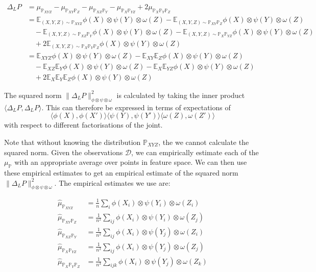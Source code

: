 \documentclass[12pt]{article}
\numberwithin{claim}{section}
\numberwithin{lemma}{section}
\numberwithin{theorem}{section}
\begin{document}
\begin{align*}
\Delta_LP &= \mu_{\mathbb{P}_{XYZ}} - \mu_{\mathbb{P}_{XY}\mathbb{P}_{Z}} - \mu_{\mathbb{P}_{XZ}\mathbb{P}_{Y}} - \mu_{\mathbb{P}_{X}\mathbb{P}_{YZ}} +2\mu_{\mathbb{P}_{X}\mathbb{P}_{Y}\mathbb{P}_{Z}} \\
&= \mathbb{E}_{(X,Y,Z) \sim \mathbb{P}_{XYZ}}\phi(X) \otimes \psi(Y) \otimes \omega(Z) -
\mathbb{E}_{(X,Y,Z) \sim \mathbb{P}_{XY}\mathbb{P}_{Z}}\phi(X) \otimes \psi(Y) \otimes \omega(Z) \\ &\quad -
\mathbb{E}_{(X,Y,Z) \sim \mathbb{P}_{XZ}\mathbb{P}_{Y}}\phi(X) \otimes \psi(Y) \otimes \omega(Z) -
\mathbb{E}_{(X,Y,Z) \sim \mathbb{P}_{X}\mathbb{P}_{YZ}}\phi(X) \otimes \psi(Y) \otimes \omega(Z) \\&\quad +
2\mathbb{E}_{(X,Y,Z) \sim \mathbb{P}_{X}\mathbb{P}_{Y}\mathbb{P}_{Z}}\phi(X) \otimes \psi(Y) \otimes \omega(Z) \\
&= \mathbb{E}_{XYZ}\phi(X) \otimes \psi(Y) \otimes \omega(Z) -
\mathbb{E}_{XY}\mathbb{E}_{Z}\phi(X) \otimes \psi(Y) \otimes \omega(Z) \\ &\quad -
\mathbb{E}_{XZ}\mathbb{E}_{Y}\phi(X) \otimes \psi(Y) \otimes \omega(Z) -
\mathbb{E}_{X}\mathbb{E}_{YZ}\phi(X) \otimes \psi(Y) \otimes \omega(Z) \\&\quad +
2\mathbb{E}_{X}\mathbb{E}_{Y}\mathbb{E}_{Z}\phi(X) \otimes \psi(Y) \otimes \omega(Z) 
\end{align*}

The squared norm $\| \Delta_LP \|_{\phi \otimes \psi \otimes \omega}^2$ is calculated by taking the inner product $\langle \Delta_LP,\Delta_LP \rangle$. This can therefore be expressed in terms of expectations of \[\langle \phi(X) , \phi(X') \rangle \langle \psi(Y) , \psi(Y') \rangle \langle \omega(Z) , \omega(Z') \rangle\] with respect to different factorisations of the joint.

Note that without knowing the distribution $\mathbb{P}_{XYZ}$, the we cannot calculate the squared norm. Given the observations $\mathcal{D}$, we can empirically estimate each of the $\mu_{\mathbb{P}}$ with an appropriate average over points in feature space. We can then use these empirical estimates to get an empirical estimate of the squared norm $\| \Delta_LP \|_{\phi \otimes \psi \otimes \omega}^2$. The empirical estimates we use are:

\begin{align*}
\hat\mu_{\mathbb{P}_{XYZ}} & =  \frac{1}{n}\sum_{i} \phi(X_i) \otimes \psi(Y_i) \otimes \omega(Z_i)\\
\hat\mu_{\mathbb{P}_{XY}\mathbb{P}_{Z}} & =  \frac{1}{n^2}\sum_{ij} \phi(X_i) \otimes \psi(Y_i) \otimes \omega(Z_j)\\
\hat\mu_{\mathbb{P}_{XZ}\mathbb{P}_{Y}} & = \frac{1}{n^2} \sum_{ij} \phi(X_i) \otimes \psi(Y_j) \otimes \omega(Z_i)\\
\hat\mu_{\mathbb{P}_{X}\mathbb{P}_{YZ}} & = \frac{1}{n^2} \sum_{ij} \phi(X_i) \otimes \psi(Y_j) \otimes \omega(Z_j)\\
\hat\mu_{\mathbb{P}_{X}\mathbb{P}_{Y}\mathbb{P}_{Z}} & =  \frac{1}{n^3}\sum_{ijk} \phi(X_i) \otimes \psi(Y_j) \otimes \omega(Z_k)\\
\end{align*}
\end{document}
